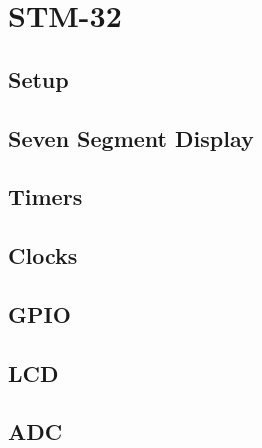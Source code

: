 \documentclass[11pt]{book}
\begin{document}
\chapter{STM-32}
\section{Setup}

\section{Seven Segment Display}

\section{Timers}

\section{Clocks}

\section{GPIO}

\section{LCD}

\section{ADC}





\backmatter
\appendix
\iffalse
\chapter{Manual}

\fi


\latexprintindex
\end{document}
